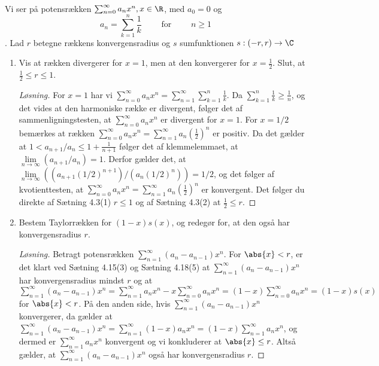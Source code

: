 \begin{opg}\hfill\\
	Vi ser på potensrækken $ \sum_{n=0}^{\infty}a_n x^n, x\in \R $, med $ a_0=0 $ og $$ a_n=\sum_{k=1}^{n}\frac1k \qquad\text{ for }\qquad n\geq1 $$. Lad $ r $ betegne rækkens konvergensradius og $ s $ sumfunktionen $ s: (-r,r)\to \C $
\begin{enumerate}
    \item Vis at rækken divergerer for $ x=1 $, men at den konvergerer for $ x=\frac{1}{2} $. Slut, at $ \frac{1}{2}\leq r\leq1 $.
    \ifanswers
    \begin{proof}[Løsning]
    	For $ x=1 $ har vi $ \sum_{n=0}^{\infty}a_n x^n=\sum_{n=1}^{\infty}\sum_{k=1}^{n}\frac{1}{k} $. Da $ \sum_{k=1}^{n}\frac{1}{k}\geq \frac1n $, og det vides at den harmoniske række er divergent, følger det af sammenligningstesten, at $ \sum_{n=0}^{\infty}a_n x^n $ er divergent for $ x=1 $. For $ x=1/2 $ bemærkes at rækken $ \sum_{n=0}^{\infty}a_n x^n=\sum_{n=1}^{\infty}a_n\left(\frac{1}{2}\right)^n $ er positiv. Da det gælder at $ 1<a_{n+1}/a_n\leq1+\frac{1}{n+1} $ følger det af klemmelemmaet, at $ \lim\limits_{n\to\infty}(a_{n+1}/a_n)=1 $. Derfor gælder det, at\\ $ \lim\limits_{n\to\infty}\left((a_{n+1}(1/2)^{n+1})/(a_n(1/2)^n)\right)=1/2 $, og det følger af kvotienttesten, at $ \sum_{n=0}^{\infty}a_n x^n=\sum_{n=1}^{\infty}a_n\left(\frac{1}{2}\right)^n $ er konvergent. Det følger du direkte af Sætning 4.3(1)  $ r\leq 1 $ og af Sætning 4.3(2) at $ \frac12\leq r $.
    \end{proof}
    \fi
    \item Bestem Taylorr\ae{}kken for $ (1-x)s(x) $, og redegør for, at den også har konvergensradius $ r $.
    \ifanswers
    \begin{proof}[Løsning]
    	Betragt potensrækken $ \sum_{n=1}^{\infty}(a_n-a_{n-1})x^n $. For $ \abs{x}<r $, er det klart ved Sætning 4.15(3) og Sætning 4.18(5) at $ \sum_{n=1}^{\infty}(a_n-a_{n-1})x^n $ har konvergensradius mindst $ r $ og at $ \sum_{n=1}^{\infty}(a_n-a_{n-1})x^n=\sum_{n=1}^{\infty}a_nx^n-x\sum_{n=0}^{\infty}a_nx^n=(1-x)\sum_{n=0}^{\infty}a_nx^n=(1-x)s(x) $ for $ \abs{x}< r $.
    	På den anden side, hvis $ \sum_{n=1}^{\infty}(a_n-a_{n-1})x^n $ konvergerer, da gælder at $ \sum_{n=1}^{\infty}(a_n-a_{n-1})x^n=\sum_{n=1}^{\infty}(1-x)a_nx^n=(1-x)\sum_{n=1}^{\infty}a_nx^n $, og dermed er $\sum_{n=1}^{\infty}a_nx^n  $ konvergent og vi konkluderer at $ \abs{x}\leq r $. Altså gælder, at $ \sum_{n=1}^{\infty}(a_n-a_{n-1})x^n $ også har konvergensradius $ r $.

\end{proof}
\end{enumerate}
\end{opg}
